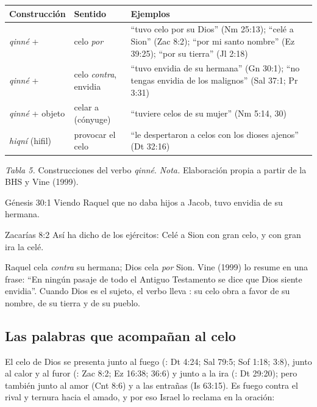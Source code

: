 \begin{center}\small\renewcommand{\arraystretch}{1.18}
\begin{tabular}{@{}L{2.8cm}L{3.4cm}L{7.6cm}@{}}
\toprule
\textbf{Construcción} & \textbf{Sentido} & \textbf{Ejemplos} \\ \midrule
\emph{qinné} +  & celo \emph{por} & ``tuvo celo por su Dios'' (Nm 25:13); ``celé a Sion'' (Zac 8:2); ``por mi santo nombre'' (Ez 39:25); ``por su tierra'' (Jl 2:18) \\
\emph{qinné} +  & celo \emph{contra}, envidia & ``tuvo envidia de su hermana'' (Gn 30:1); ``no tengas envidia de los malignos'' (Sal 37:1; Pr 3:31) \\
\emph{qinné} + objeto & celar a (cónyuge) & ``tuviere celos de su mujer'' (Nm 5:14, 30) \\
\emph{hiqní} (hifil) & provocar el celo & ``le despertaron a celos con los dioses ajenos'' (Dt 32:16) \\
\bottomrule
\end{tabular}\par
{\footnotesize\color{gris}\textit{Tabla 5.} Construcciones del verbo \emph{qinné}. \textit{Nota.} Elaboración propia a partir de la BHS y Vine (1999).}
\end{center}

\begin{verso}{Génesis 30:1}
Viendo Raquel que no daba hijos a Jacob, tuvo envidia de su hermana.
\end{verso}
\begin{verso}{Zacarías 8:2}
Así ha dicho \SENOR{} de los ejércitos: Celé a Sion con gran celo, y con gran ira la celé.
\end{verso}

Raquel cela \emph{contra} su hermana; Dios cela \emph{por} Sion. Vine (1999) lo resume en una frase: ``En ningún pasaje de todo el Antiguo Testamento se dice que Dios siente envidia''. Cuando Dios es el sujeto, el verbo lleva : su celo obra a favor de su nombre, de su tierra y de su pueblo.

\subsection{Las palabras que acompañan al celo}
El celo de Dios se presenta junto al fuego (: Dt 4:24; Sal 79:5; Sof 1:18; 3:8), junto al calor y al furor (: Zac 8:2; Ez 16:38; 36:6) y junto a la ira (: Dt 29:20); pero también junto al amor (Cnt 8:6) y a las entrañas (Is 63:15). Es fuego contra el rival y ternura hacia el amado, y por eso Israel lo reclama en la oración:

